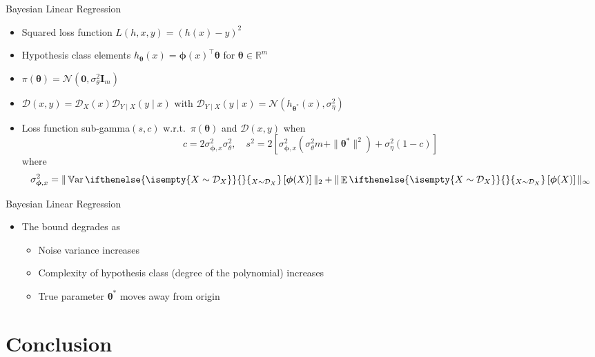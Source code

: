 \documentclass[aspectratio=169]{beamer}
\DeclareMathOperator*{\EvOp}{\mathbb{E}}
\DeclareMathOperator*{\VarOp}{\mathbb{V}ar}
\newcommand{\CD}{\mathcal{D}}
\newcommand{\RR}{\mathbb{R}}
\newcommand*{\Ev}[2][]{%
  \mathchoice{%
    \EvOp\ifthenelse{\isempty{#1}}{}{_{#1}}\left[#2\right]%
  }{%
    \EvOp\ifthenelse{\isempty{#1}}{}{_{#1}}[#2]%
  }{%
    \EvOp\ifthenelse{\isempty{#1}}{}{_{#1}}[#2]%
  }{%
    \EvOp\ifthenelse{\isempty{#1}}{}{_{#1}}[#2]%
  }%
}
\newcommand*{\Var}[2][]{%
  \mathchoice{%
    \VarOp\ifthenelse{\isempty{#1}}{}{_{#1}}\left[#2\right]%
  }{%
    \VarOp\ifthenelse{\isempty{#1}}{}{_{#1}}[#2]%
  }{%
    \VarOp\ifthenelse{\isempty{#1}}{}{_{#1}}[#2]%
  }{%
    \VarOp\ifthenelse{\isempty{#1}}{}{_{#1}}[#2]%
  }%
}
\begin{document}
\begin{frame}{Bayesian Linear Regression}
  \begin{itemize}
    \item
      Squared loss function $L(h, x, y) = (h(x) - y)^2$
    \item
      Hypothesis class elements $h_{\bm{\theta}}(x) = \bm{\phi}(x)^\top
      \bm{\theta}$ for $\bm{\theta} \in \RR^m$
    \item
      $\pi(\bm{\theta}) = \mathcal{N}(\bm{0}, \sigma_\theta^2
      \mathbf{I}_m)$
    \item
      $\CD(x, y) = \CD_X(x) \CD_{Y \mid X}(y \mid x)$ with
      $\CD_{Y \mid X}(y \mid x) = \mathcal{N}(h_{\bm{\theta}^*}(x),
      \sigma_\eta^2)$
    \item
      Loss function sub-gamma$(s, c)$ w.r.t.\ $\pi(\bm{\theta})$ and $\CD(x, y)$
      when
      \begin{equation*}
        c = 2 \sigma_{\bm{\phi},x}^2 \sigma_\theta^2, \quad s^2 = 2
        [\sigma_{\bm{\phi},x}^2 (\sigma_\theta^2 m + \| \bm{\theta}^* \|^2) +
        \sigma_\eta^2 (1 - c)] 
      \end{equation*}
      where
      \begin{equation*}
        \sigma_{\bm{\phi},x}^2 = \| \Var[X \sim \CD_X]{\bm{\phi}(X)} \|_2 + \|
        \Ev[X \sim \CD_X]{\bm{\phi}(X)} \|_\infty
      \end{equation*}
  \end{itemize}
\end{frame}

\begin{frame}{Bayesian Linear Regression}
  \begin{itemize}
    \item
      The bound degrades as
      \begin{itemize}
        \item
          Noise variance increases
        \item
          Complexity of hypothesis class (degree of the polynomial) increases
        \item
          True parameter $\bm{\theta}^*$ moves away from origin
      \end{itemize}
  \end{itemize}
\end{frame}

\section{Conclusion}
\end{document}

